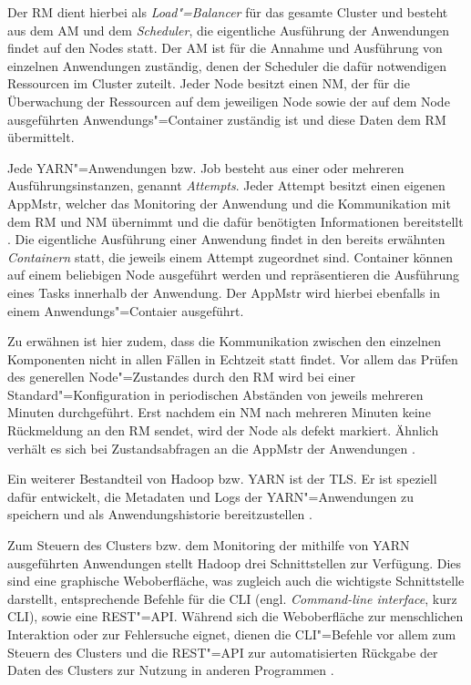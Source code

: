 Der \gls{RM} dient hierbei als \emph{Load"=Balancer} für das gesamte Cluster und besteht aus dem \gls{AM} und dem \emph{Scheduler}, die eigentliche Ausführung der Anwendungen findet auf den Nodes statt.
Der \gls{AM} ist für die Annahme und Ausführung von einzelnen Anwendungen zuständig, denen der Scheduler die dafür notwendigen Ressourcen im Cluster zuteilt.
Jeder Node besitzt einen \gls{NM}, der für die Überwachung der Ressourcen auf dem jeweiligen Node sowie der auf dem Node ausgeführten Anwendungs"=Container zuständig ist und diese Daten dem \gls{RM} übermittelt.

Jede YARN"=Anwendungen bzw. Job besteht aus einer oder mehreren Ausführungsinstanzen, genannt \emph{Attempts}.
Jeder Attempt besitzt einen eigenen \gls{AppMstr}, welcher das Monitoring der Anwendung und die Kommunikation mit dem \gls{RM} und \gls{NM} übernimmt und die dafür benötigten Informationen bereitstellt \cite{HadoopYarnArch271}.
Die eigentliche Ausführung einer Anwendung findet in den bereits erwähnten \emph{Containern} statt, die jeweils einem Attempt zugeordnet sind.
Container können auf einem beliebigen Node ausgeführt werden und repräsentieren die Ausführung eines Tasks innerhalb der Anwendung.
Der \gls{AppMstr} wird hierbei ebenfalls in einem Anwendungs"=Contaier ausgeführt.

Zu erwähnen ist hier zudem, dass die Kommunikation zwischen den einzelnen Komponenten nicht in allen Fällen in Echtzeit statt findet.
Vor allem das Prüfen des generellen Node"=Zustandes durch den \gls{RM} wird bei einer Standard"=Konfiguration in periodischen Abständen von jeweils mehreren Minuten durchgeführt.
Erst nachdem ein \gls{NM} nach mehreren Minuten keine Rückmeldung an den \gls{RM} sendet, wird der Node als defekt markiert.
Ähnlich verhält es sich bei Zustandsabfragen an die \gls{AppMstr} der Anwendungen \cite{HadoopYarnConfig271}.

Ein weiterer Bestandteil von Hadoop bzw. YARN ist der \gls{TLS}.
Er ist speziell dafür entwickelt, die Metadaten und Logs der YARN"=Anwendungen zu speichern und als Anwendungshistorie bereitzustellen \cite{HadoopYarnTlServer271}.

Zum Steuern des Clusters bzw. dem Monitoring der mithilfe von YARN ausgeführten Anwendungen stellt Hadoop drei Schnittstellen zur Verfügung.
Dies sind eine graphische Weboberfläche, was zugleich auch die wichtigste Schnittstelle darstellt, entsprechende Befehle für die \acrlong{CLI} (engl. \emph{Command-line interface}, kurz \acrshort{CLI}), sowie eine REST"=API.
Während sich die Weboberfläche zur menschlichen Interaktion oder zur Fehlersuche eignet, dienen die \gls{CLI}"=Befehle vor allem zum Steuern des Clusters und die REST"=API zur automatisierten Rückgabe der Daten des Clusters zur Nutzung in anderen Programmen \cite{HadoopClusterSetup271,HadoopYarnCmds271,HadoopRmApi271,HadoopNmApi271}.

